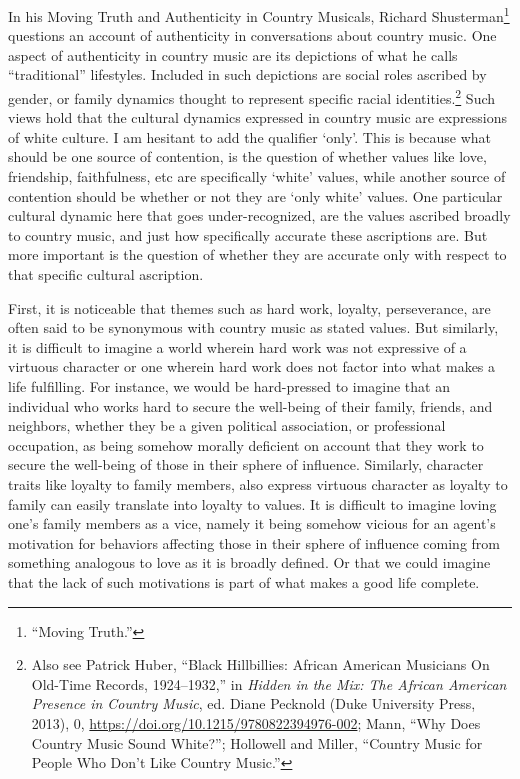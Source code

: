\documentclass[
  12pt,
]{book}
\theoremstyle{definition}
\theoremstyle{definition}
\theoremstyle{definition}
\theoremstyle{definition}
\theoremstyle{remark}
\begin{document}
In his Moving Truth and Authenticity in Country Musicals, Richard Shusterman\footnote{{``Moving {Truth}.''}} questions an account of authenticity in conversations about country music. One aspect of authenticity in country music are its depictions of what he calls ``traditional'' lifestyles. Included in such depictions are social roles ascribed by gender, or family dynamics thought to represent specific racial identities.\footnote{Also see Patrick Huber, {``Black {Hillbillies}: {African American Musicians On Old-Time Records}, 1924--1932,''} in \emph{Hidden in the {Mix}: {The African American Presence} in {Country Music}}, ed. Diane Pecknold (Duke University Press, 2013), 0, \url{https://doi.org/10.1215/9780822394976-002}; Mann, {``Why Does Country Music Sound White?''}; Hollowell and Miller, {``Country {Music} for {People Who Don}'t {Like Country Music}.''}} Such views hold that the cultural dynamics expressed in country music are expressions of white culture. I am hesitant to add the qualifier `only'. This is because what should be one source of contention, is the question of whether values like love, friendship, faithfulness, etc are specifically `white' values, while another source of contention should be whether or not they are `only white' values. One particular cultural dynamic here that goes under-recognized, are the values ascribed broadly to country music, and just how specifically accurate these ascriptions are. But more important is the question of whether they are accurate only with respect to that specific cultural ascription.

First, it is noticeable that themes such as hard work, loyalty, perseverance, are often said to be synonymous with country music as stated values. But similarly, it is difficult to imagine a world wherein hard work was not expressive of a virtuous character or one wherein hard work does not factor into what makes a life fulfilling. For instance, we would be hard-pressed to imagine that an individual who works hard to secure the well-being of their family, friends, and neighbors, whether they be a given political association, or professional occupation, as being somehow morally deficient on account that they work to secure the well-being of those in their sphere of influence. Similarly, character traits like loyalty to family members, also express virtuous character as loyalty to family can easily translate into loyalty to values. It is difficult to imagine loving one's family members as a vice, namely it being somehow vicious for an agent's motivation for behaviors affecting those in their sphere of influence coming from something analogous to love as it is broadly defined. Or that we could imagine that the lack of such motivations is part of what makes a good life complete.
\end{document}

